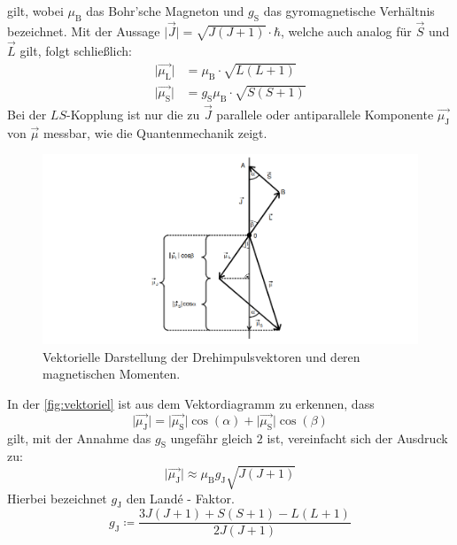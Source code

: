gilt, wobei $\mu_{\text{B}}$ das Bohr'sche Magneton und $g_{\text{S}}$ das gyromagnetische Verhältnis bezeichnet.
Mit der Aussage $\lvert \vec{J} \rvert = \sqrt{J(J+1)} \cdot \hbar $, welche auch analog für $\vec{S}$ und $\vec{L}$ gilt, folgt schließlich:
\begin{align}
    \lvert \vec{\mu_{\text{L}}} \rvert &= \mu_{\text{B}} \cdot \sqrt{L(L+1)} \\
    \lvert \vec{\mu_{\text{S}}} \rvert &= g_{\text{S}} \mu_{\text{B}} \cdot \sqrt{S(S+1)}
\end{align}
Bei der $LS$-Kopplung ist nur die zu $\vec{J}$ parallele oder antiparallele Komponente $\vec{\mu_{\text{J}}}$ von $\vec{\mu}$ messbar, wie die Quantenmechanik zeigt.
\begin{figure}
    \centering
    \includegraphics[width=\textwidth]{content/vektorielle Darstellung.png}
    \caption{Vektorielle Darstellung der Drehimpulsvektoren und deren magnetischen Momenten. \cite{anleitung}}
    \label{fig:vektoriel}
\end{figure} 
In der \autoref{fig:vektoriel} ist aus dem Vektordiagramm zu erkennen, dass
\begin{equation}
    \lvert \vec{\mu_{\text{J}}} \rvert = \lvert \vec{\mu_{\text{S}}} \rvert \cos(\alpha) + \lvert \vec{\mu_{\text{S}}} \rvert \cos(\beta)
\end{equation}
gilt, mit der Annahme das $g_{\text{S}}$ ungefähr gleich $\num{2}$ ist, vereinfacht sich der Ausdruck zu:
\begin{equation}
    \lvert \vec{\mu_{\text{J}}} \rvert \approx \mu_{\text{B}} g_{\text{J}} \sqrt{J(J+1)} 
\end{equation}
Hierbei bezeichnet $g_{\text{J}}$ den Land\'{e} - Faktor. 
\begin{equation*}
    g_{\text{J}} \coloneq \frac{3J(J+1) + S(S+1)-L(L+1)}{2J(J+1)}
\end{equation*}
